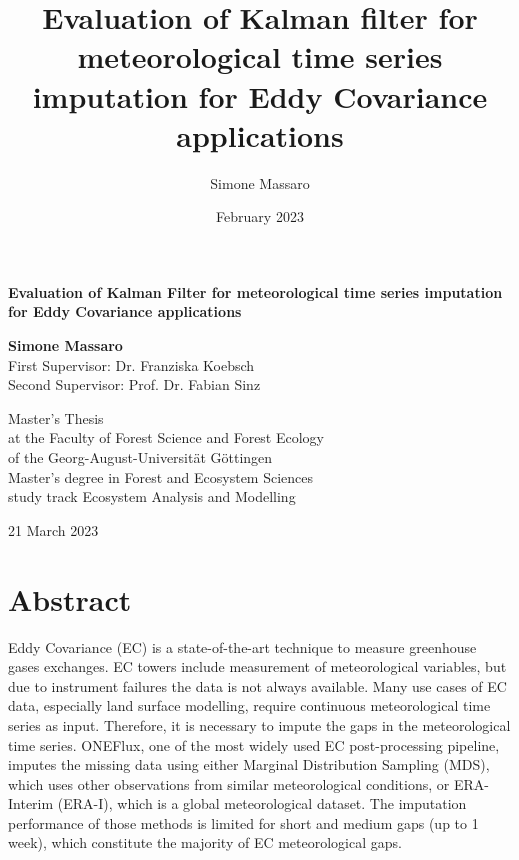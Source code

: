 \documentclass{article}
\title{Evaluation of Kalman filter for meteorological time series imputation  for Eddy Covariance applications}
\author{Simone Massaro}
\date{February 2023}
\let\Oldsection\section
\renewcommand{\section}{\FloatBarrier\Oldsection}
\begin{document}
\newcommand{\vv}[1]{\texttt{#1}}

\begin{titlepage}
    \begin{center}
        \vspace*{1cm}

        \Huge
        \textbf{Evaluation of Kalman Filter for meteorological time series imputation for Eddy Covariance applications}

        \vspace{0.5cm}
        \LARGE

        \vspace{1.5cm}

        \textbf{Simone Massaro} \\
        \vspace{1.5cm}
        \Large
        First Supervisor: Dr. Franziska Koebsch\\
        Second Supervisor: Prof. Dr. Fabian Sinz
        \vfill
        
        Master's Thesis \\ 
        at the Faculty of Forest Science and Forest Ecology \\ 
        of the Georg-August-Universität Göttingen\\
        
        \vspace{0.8cm}
        Master's degree in Forest and Ecosystem Sciences \\
        study track Ecosystem Analysis and Modelling

        \vspace{2cm}
        21 March 2023

    \end{center}
\end{titlepage}
\clearpage

\section*{Abstract}

Eddy Covariance (EC) is a state-of-the-art technique to measure greenhouse gases exchanges. EC towers include measurement of meteorological variables, but due to instrument failures the data is not always available. Many use cases of EC data, especially land surface modelling, require continuous meteorological time series as input. Therefore, it is necessary to impute the gaps in the meteorological time series. ONEFlux, one of the most widely used EC post-processing pipeline, imputes the missing data using either Marginal Distribution Sampling (MDS), which uses other observations from similar meteorological conditions, or ERA-Interim (ERA-I), which is a global meteorological dataset. The imputation performance of those methods is limited for short and medium gaps (up to 1 week), which constitute the majority of EC meteorological gaps.
\end{document}
